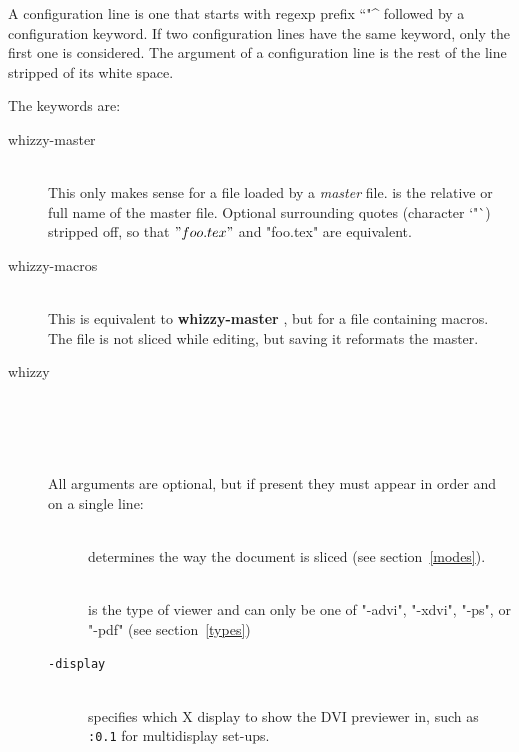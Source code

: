 \documentclass[12pt]{article}
\begin{document}
A configuration line is one that starts with regexp prefix ``\lst"^%
followed by a configuration keyword.  If two configuration lines have the same
keyword, only the first one is considered. The argument of a configuration
line is the rest of the line stripped of its white space.

The keywords are:
\begin{description}
\item[whizzy-master]
\\
This only makes sense for a file loaded by a {\em master} file. 
 is the relative or full name of the
master file. Optional surrounding quotes (character \lst`"`) %
%
stripped off, so that \lst$"foo.tex"$ and \lst"foo.tex" are equivalent.

\item[whizzy-macros]
\\
  This is equivalent to {\bf whizzy-master} , but for a file
  containing   macros. The file is not sliced while editing, but 
  saving it reformats the master. 

\item[whizzy] 
\\
 \\
\\
\\[1em]
All arguments are optional, but if present they must appear in order and on
a single line:
\begin{description}
\item[]\indent\\ 
determines the way the document is sliced
(see section~\ref{modes}).

\item[]\indent\\
is the type of viewer and can only be one of 
\lst"-advi", \lst"-xdvi", \lst"-ps", or \lst"-pdf" (see section~\ref{types})

\item[\texttt{-display} ]\indent\\
specifies which X display to show the DVI previewer in,
such as \texttt{:0.1} for multidisplay set-ups.


\end{description}
\end{description}
\end{document}
